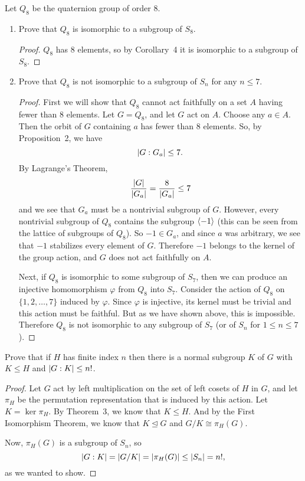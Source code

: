  Let $Q_8$ be the quaternion group of order $8$.
\begin{enumerate}
\item Prove that $Q_8$ is isomorphic to a subgroup of $S_8$.
  \begin{proof}
    $Q_8$ has $8$ elements, so by Corollary~4 it is isomorphic to a
    subgroup of $S_8$.
  \end{proof}

\item Prove that $Q_8$ is not isomorphic to a subgroup of $S_n$ for
  any $n\leq7$.
  \begin{proof}
    First we will show that $Q_8$ cannot act faithfully on a set $A$
    having fewer than $8$ elements. Let $G = Q_8$, and let $G$ act on
    $A$. Choose any $a\in A$. Then the orbit of $G$ containing $a$ has
    fewer than $8$ elements. So, by Proposition~2, we have
    \begin{equation*}
      \lvert{G : G_a}\rvert \leq 7.
    \end{equation*}
    By Lagrange's Theorem,
    \begin{equation*}
      \frac{\lvert{G}\rvert}{\lvert{G_a}\rvert} = \frac8{\lvert{G_a}\rvert} \leq 7
    \end{equation*}
    and we see that $G_a$ must be a nontrivial subgroup of
    $G$. However, every nontrivial subgroup of $Q_8$ contains the
    subgroup $\langle{-1}\rangle$ (this can be seen from the lattice of
    subgroups of $Q_8$). So $-1\in G_a$, and since $a$ was arbitrary,
    we see that $-1$ stabilizes every element of $G$. Therefore $-1$
    belongs to the kernel of the group action, and $G$ does not act
    faithfully on $A$.

    Next, if $Q_8$ is isomorphic to some subgroup of $S_7$, then we
    can produce an injective homomorphism $\varphi$ from $Q_8$ into
    $S_7$. Consider the action of $Q_8$ on $\{1,2,\dots,7\}$ induced
    by $\varphi$. Since $\varphi$ is injective, its kernel must be
    trivial and this action must be faithful. But as we have shown
    above, this is impossible. Therefore $Q_8$ is not isomorphic to
    any subgroup of $S_7$ (or of $S_n$ for $1\leq n\leq7$).
  \end{proof}
\end{enumerate}

 Prove that if $H$ has finite index $n$ then there is a
normal subgroup $K$ of $G$ with $K\leq H$ and $\lvert{G:K}\rvert\leq n!$.
\begin{proof}
  Let $G$ act by left multiplication on the set of left cosets of $H$
  in $G$, and let $\pi_H$ be the permutation representation that is
  induced by this action. Let $K = \ker\pi_H$. By Theorem~3, we know
  that $K\leq H$. And by the First Isomorphism Theorem, we know that
  $K\trianglelefteq G$ and $G/K\cong\pi_H(G)$.

  Now, $\pi_H(G)$ is a subgroup of $S_n$, so
  \begin{equation*}
    \lvert{G:K}\rvert = \lvert{G/K}\rvert = \lvert{\pi_H(G)}\rvert \leq \lvert{S_n}\rvert = n!,
  \end{equation*}
  as we wanted to show.
\end{proof}
